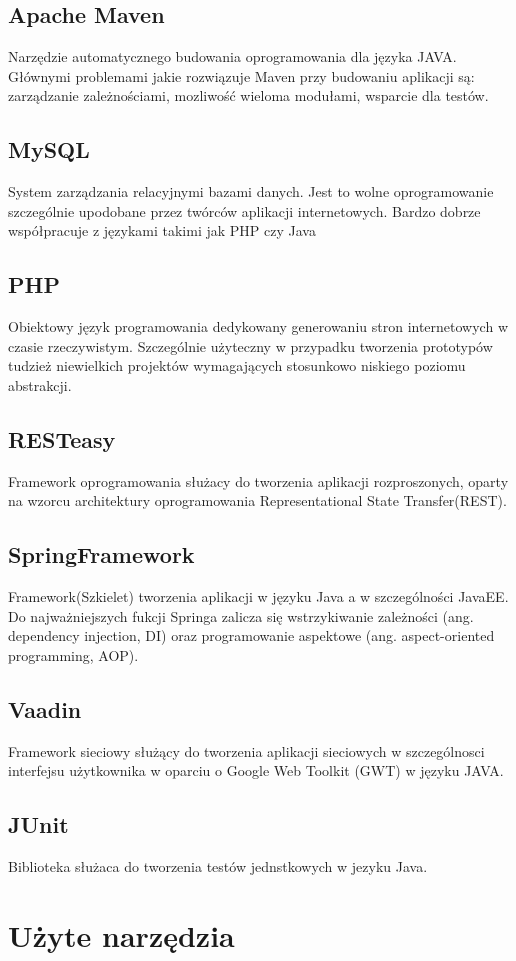 \documentclass[11pt,a4paper,polish,thesis]{dcsbook}
\begin{document}
\subsection{Apache Maven}
Narzędzie automatycznego budowania oprogramowania dla języka JAVA. Głównymi problemami jakie rozwiązuje Maven przy budowaniu aplikacji są: zarządzanie zależnościami, mozliwość wieloma modułami, wsparcie dla testów.
\subsection{MySQL}
System zarządzania relacyjnymi bazami danych. Jest to wolne oprogramowanie szczególnie upodobane przez twórców aplikacji internetowych. Bardzo dobrze współpracuje z językami takimi jak PHP czy Java
\subsection{PHP}
Obiektowy język programowania dedykowany generowaniu stron internetowych w czasie rzeczywistym. Szczególnie użyteczny w przypadku tworzenia prototypów tudzież niewielkich projektów wymagających stosunkowo niskiego poziomu abstrakcji.
\subsection{RESTeasy}
Framework oprogramowania służacy do tworzenia aplikacji rozproszonych, oparty na wzorcu architektury oprogramowania Representational State Transfer(REST).
\subsection{SpringFramework}
Framework(Szkielet) tworzenia aplikacji w języku Java a w szczególności JavaEE. Do najważniejszych fukcji Springa zalicza się wstrzykiwanie zależności (ang. dependency injection, DI) oraz programowanie aspektowe (ang. aspect-oriented programming, AOP).  
\subsection{Vaadin}
Framework sieciowy służący do tworzenia aplikacji sieciowych w szczególnosci interfejsu użytkownika w oparciu o Google Web Toolkit (GWT) w języku JAVA.
\subsection{JUnit}
Biblioteka służaca do tworzenia testów jednstkowych w jezyku Java.

\section{Użyte narzędzia}
\end{document}
